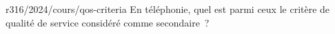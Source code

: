 \begin{question}{r316/2024/cours/qos-criteria}
  En téléphonie, quel est parmi ceux le critère de qualité de
  service considéré comme secondaire~?
  \begin{reponses}
  \end{reponses}
\end{question}
